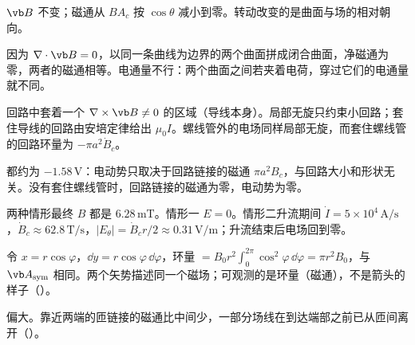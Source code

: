 \begin{answers}
\item $\vb B$ 不变；磁通从 $BA_c$ 按 $\cos\theta$ 减小到零。转动改变的是曲面与场的相对朝向。
\item 因为 $\nabla\cdot\vb B=0$，以同一条曲线为边界的两个曲面拼成闭合曲面，净磁通为零，两者的磁通相等。电通量不行：两个曲面之间若夹着电荷，穿过它们的电通量就不同。
\item 回路中套着一个 $\nabla\times\vb B\neq0$ 的区域（导线本身）。局部无旋只约束小回路；套住导线的回路由安培定律给出 $\mu_0I$。螺线管外的电场同样局部无旋，而套住螺线管的回路环量为 $-\pi a^2\dot B_c$。
\item 都约为 $-1.58\,\mathrm V$：电动势只取决于回路链接的磁通 $\pi a^2B_c$，与回路大小和形状无关。没有套住螺线管时，回路链接的磁通为零，电动势为零。
\item 两种情形最终 $B$ 都是 $6.28\,\mathrm{mT}$。情形一 $E=0$。情形二升流期间 $\dot I=5\times10^4\,\mathrm{A/s}$，$\dot B_c\approx62.8\,\mathrm{T/s}$，$|E_\theta|=\dot B_cr/2\approx0.31\,\mathrm{V/m}$；升流结束后电场回到零。
\item 令 $x=r\cos\varphi$，$\dd y=r\cos\varphi\,\dd\varphi$，环量 $=B_0r^2\int_0^{2\pi}\cos^2\varphi\,\dd\varphi=\pi r^2B_0$，与 $\vb A_{\rm sym}$ 相同。两个矢势描述同一个磁场；可观测的是环量（磁通），不是箭头的样子（）。
\item 偏大。靠近两端的匝链接的磁通比中间少，一部分场线在到达端部之前已从匝间离开（）。
\end{answers}
